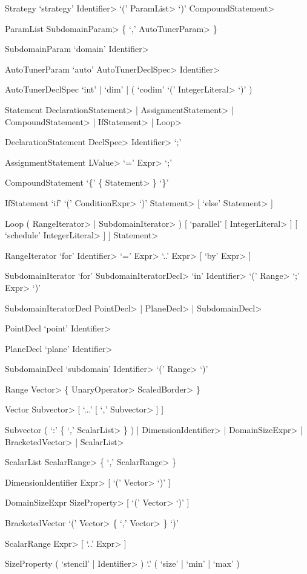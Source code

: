 \begin{EBNF}
	\item[Strategy]
		`strategy' \<Identifier> `(' \<ParamList> `)' \<CompoundStatement>
	\item[ParamList]
		\<SubdomainParam> \{ `,' \<AutoTunerParam> \}
	\item[SubdomainParam]
		`domain' \<Identifier>	
	\item[AutoTunerParam]
		`auto' \<AutoTunerDeclSpec> \<Identifier>
	\item[AutoTunerDeclSpec]
		`int' | `dim' | ( `codim' `(' \<IntegerLiteral> `)' )

	\item[Statement]
		\<DeclarationStatement> | \<AssignmentStatement> | \<CompoundStatement> | \<IfStatement> | \<Loop> %
	\item[DeclarationStatement]
		\<DeclSpec> \<Identifier> `;'
	\item[AssignmentStatement]
		\<LValue> `=' \<Expr> `;'
	\item[CompoundStatement]
		`\{' \{ \<Statement> \} `\}'
	\item[IfStatement]
		`if' `(' \<ConditionExpr> `)' \<Statement> [ `else' \<Statement> ]
	\item[Loop]
		( \<RangeIterator> | \<SubdomainIterator> ) [ `parallel' [ \<IntegerLiteral> ] [ `schedule' \<IntegerLiteral> ] ] \<Statement>

	\item[RangeIterator]
		`for' \<Identifier> `=' \<Expr> `..' \<Expr> [ `by' \<Expr> ]

	\item[SubdomainIterator]
		`for' \<SubdomainIteratorDecl> `in' \<Identifier> `(' \<Range> `;' \<Expr> `)'

	\item[SubdomainIteratorDecl]
		\<PointDecl> | \<PlaneDecl> | \<SubdomainDecl>
	\item[PointDecl]
		`point' \<Identifier>
	\item[PlaneDecl]
		`plane' \<Identifier>
	\item[SubdomainDecl]
		`subdomain' \<Identifier> `(' \<Range> `)'
		
	\item[Range]
		\<Vector> \{ \<UnaryOperator> \<ScaledBorder> \}
	\item[Vector]
		\<Subvector> [ `...' [ `,' \<Subvector> ] ]
	\item[Subvector]
		( `:' \{ `,' \<ScalarList> \} ) | \<DimensionIdentifier> | \<DomainSizeExpr> | \<BracketedVector> | \<ScalarList>
	\item[ScalarList]
		\<ScalarRange> \{ `,' \<ScalarRange> \}
	\item[DimensionIdentifier]
		\<Expr> [ `(' \<Vector> `)' ]
	\item[DomainSizeExpr]
		\<SizeProperty> [ `(' \<Vector> `)' ]
	\item[BracketedVector]
		`(' \<Vector> \{ `,' \<Vector> \} `)'
	\item[ScalarRange]
		\<Expr> [ `..' \<Expr> ]
	\item[SizeProperty]
		( `stencil' | \<Identifier> ) `.' ( `size' | `min' | `max' )
			

\end{EBNF}
